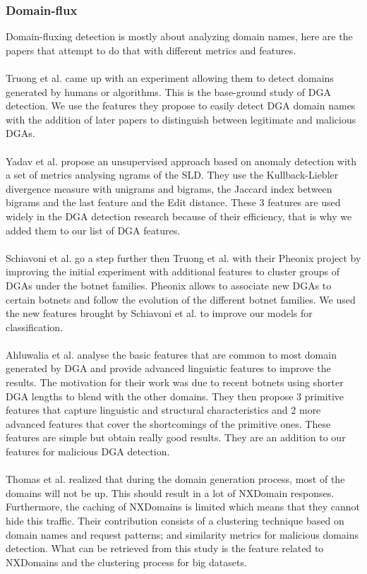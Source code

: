 \subsubsection{Domain-flux}
Domain-fluxing detection is mostly about analyzing domain names, here are the papers that attempt to do that with different metrics and features.\\
\\
Truong et al. \cite{dns-traffic} came up with an experiment allowing them to detect domains generated by humans or algorithms. This is the base-ground study of DGA detection. We use the features they propose to easily detect DGA domain names with the addition of later papers to distinguish between legitimate and malicious DGAs.\\
\\
Yadav et al. \cite{dga3} propose an unsupervised approach based on anomaly detection with a set of metrics analysing ngrams of the SLD. They use the Kullback-Liebler divergence measure with unigrams and bigrams, the Jaccard index between bigrams and the last feature and the Edit distance. These 3 features are used widely in the DGA detection research because of their efficiency, that is why we added them to our list of DGA features. \\
\\
Schiavoni et al. \cite{phoenix} go a step further then Truong et al. with their Pheonix project by improving the initial experiment with additional features to cluster groups of DGAs under the botnet families. Pheonix allows to associate new DGAs to certain botnets and follow the evolution of the different botnet families. We used the new features brought by Schiavoni et al. to improve our models for classification.\\
\\
Ahluwalia et al. \cite{dga} analyse the basic features that are common to most domain generated by DGA and provide advanced linguistic features to improve the results. The motivation for their work was due to recent botnets using shorter DGA lengths to blend with the other domains. They then propose 3 primitive features that capture linguistic and structural characteristics and 2 more advanced features that cover the shortcomings of the primitive ones. These features are simple but obtain really good results. They are an addition to our features for malicious DGA detection.\\
\\
Thomas et al. \cite{dga4} realized that during the domain generation process, most of the domains will not be up. This should result in a lot of NXDomain responses. Furthermore, the caching of NXDomains is limited which means that they cannot hide this traffic. Their contribution consists of a clustering technique based on domain names and request patterns; and similarity metrics for malicious domains detection. What can be retrieved from this study is the feature related to NXDomains and the clustering process for big datasets.


